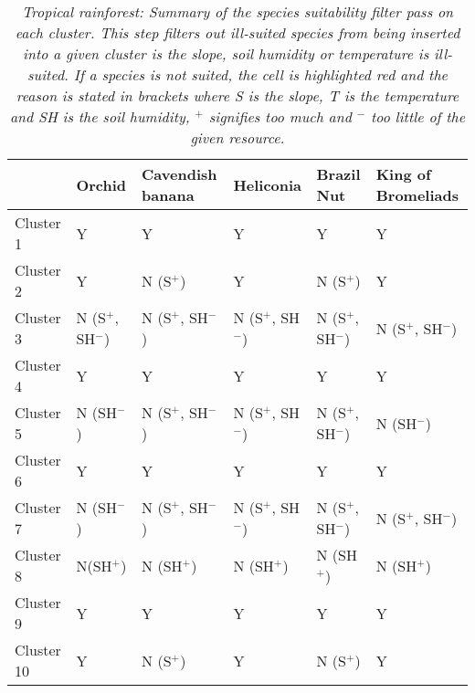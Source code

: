 \begin{table}[htb!]
  \centering
	    \begin{tabular}{|p{2cm}|p{2.5cm}|p{2.5cm}|p{2.5cm}|p{2.5cm}|p{2.5cm}|}
		\hline	
		&  \textbf{Orchid} & \textbf{Cavendish banana} & \textbf{Heliconia} & \textbf{Brazil Nut} & \textbf{King of Bromeliads}\\
		\hline	
		Cluster 1 & 
		Y & 
		Y & 
		Y & 
		Y & 
		Y \\
		\hline	
		Cluster 2 & 
		Y & 
		\cellcolor{color_red}N (S$^{+}$) & 
		Y & 
		\cellcolor{color_red}N (S$^{+}$) & 
		Y \\
		\hline	
		Cluster 3 & 
		\cellcolor{color_red}N (S$^{+}$, SH$^{-}$) & 
		\cellcolor{color_red}N (S$^{+}$, SH$^{-}$) & 
		\cellcolor{color_red}N (S$^{+}$, SH$^{-}$) & 
		\cellcolor{color_red}N (S$^{+}$, SH$^{-}$) & 
		\cellcolor{color_red}N (S$^{+}$, SH$^{-}$) \\
		\hline	
		Cluster 4 & 
		Y & 
		Y & 
		Y & 
		Y & 
		Y \\
		\hline	
		Cluster 5 & 
		\cellcolor{color_red}N (SH$^{-}$) & 
		\cellcolor{color_red}N (S$^{+}$, SH$^{-}$) & 
		\cellcolor{color_red}N (S$^{+}$, SH$^{-}$) & 
		\cellcolor{color_red}N (S$^{+}$, SH$^{-}$) & 
		\cellcolor{color_red}N (SH$^{-}$) \\
		\hline	
		Cluster 6 & 
		Y & 
		Y & 
		Y & 
		Y &
		Y \\
		\hline	
		Cluster 7 & 
		\cellcolor{color_red}N (SH$^{-}$) &
		\cellcolor{color_red}N (S$^{+}$, SH$^{-}$) &
		\cellcolor{color_red}N (S$^{+}$, SH$^{-}$) & 
		\cellcolor{color_red}N (S$^{+}$, SH$^{-}$) & 
		\cellcolor{color_red}N (S$^{+}$, SH$^{-}$) \\
		\hline	
		Cluster 8 & 
		\cellcolor{color_red}N(SH$^{+}$) & 
		\cellcolor{color_red}N (SH$^{+}$) & 
		\cellcolor{color_red}N (SH$^{+}$) & 
		\cellcolor{color_red}N (SH$^{+}$) & 
		\cellcolor{color_red}N (SH$^{+}$) \\
		\hline	
		Cluster 9 & 
		Y & 
		Y & 
		Y & 
		Y & 
		Y \\
		\hline	
		Cluster 10 &
		Y & 
		\cellcolor{color_red}N (S$^{+}$) & 
		Y & 
		\cellcolor{color_red}N (S$^{+}$) & 
		Y \\
		\hline	
		\end{tabular}
		\caption{\textit{Tropical rainforest: Summary of the species suitability filter pass on each cluster. This step filters out ill-suited species from being inserted into a given cluster is the slope, soil humidity or temperature is ill-suited. If a species is not suited, the cell is highlighted red and the reason is stated in brackets where \textit{S} is the slope, \textit{T} is the temperature and \textit{SH} is the soil humidity, $^{+}$ signifies too much and $^{-}$ too little of the given resource.}}
	  \label{tab:results_tropical_species_suitability}
\end{table}

